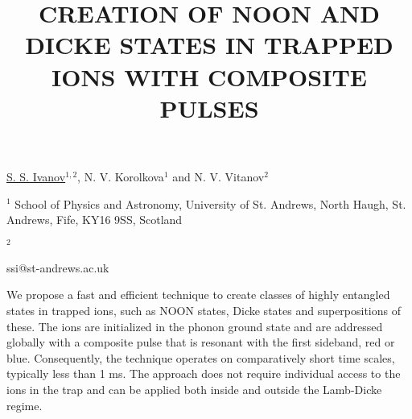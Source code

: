 \title{CREATION OF NOON AND DICKE STATES IN TRAPPED IONS WITH COMPOSITE PULSES}

\underline{S. S. Ivanov}$^{1,2}$, N. V. Korolkova$^{1}$ and N. V. Vitanov$^{2}$

{\normalsize{
\vspace{-4mm} $^{1}$ School of Physics and Astronomy, University of St. Andrews, North Haugh, St. Andrews, Fife, KY16 9SS, Scotland

\vspace{-4mm} $^{2}$ \unisofia

\email ssi@st-andrews.ac.uk}}

We propose a fast and efficient technique to create classes of highly entangled states in trapped ions, such as NOON states, Dicke states and superpositions of these.
The ions are initialized in the phonon ground state and are addressed globally with a composite pulse that is resonant with the first sideband, red or blue.
Consequently, the technique operates on comparatively short time scales, typically less than 1 ms.
The approach does not require individual access to the ions in the trap and can be applied both inside and outside the Lamb-Dicke regime.

\vspace{\baselineskip} 